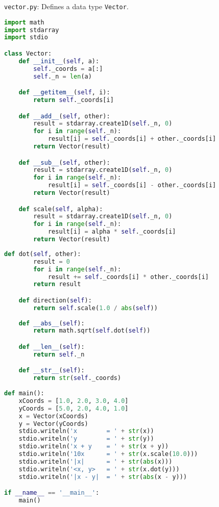 \documentclass[8pt,a4paper,compress,handout]{beamer}
\begin{document}
\begin{frame}[fragile]
\begin{framed}
\tiny \lstinline{vector.py}: Defines a data type \lstinline{Vector}.
\end{framed}

\begin{lstlisting}[language=Python]
import math
import stdarray
import stdio

class Vector:
    def __init__(self, a):
        self._coords = a[:]
        self._n = len(a)

    def __getitem__(self, i):
        return self._coords[i]

    def __add__(self, other):
        result = stdarray.create1D(self._n, 0)
        for i in range(self._n):
            result[i] = self._coords[i] + other._coords[i]
        return Vector(result)

    def __sub__(self, other):
        result = stdarray.create1D(self._n, 0)
        for i in range(self._n):
            result[i] = self._coords[i] - other._coords[i]
        return Vector(result)

    def scale(self, alpha):
        result = stdarray.create1D(self._n, 0)
        for i in range(self._n):
            result[i] = alpha * self._coords[i]
        return Vector(result)
\end{lstlisting}
\end{frame}

\begin{frame}[fragile]
\begin{lstlisting}[language=Python]
    def dot(self, other):
        result = 0
        for i in range(self._n):
            result += self._coords[i] * other._coords[i]
        return result

    def direction(self):
        return self.scale(1.0 / abs(self))
     
    def __abs__(self):
        return math.sqrt(self.dot(self))

    def __len__(self):
        return self._n

    def __str__(self):
        return str(self._coords)
        
def main():
    xCoords = [1.0, 2.0, 3.0, 4.0]
    yCoords = [5.0, 2.0, 4.0, 1.0]
    x = Vector(xCoords)
    y = Vector(yCoords)
    stdio.writeln('x        = ' + str(x))
    stdio.writeln('y        = ' + str(y))
    stdio.writeln('x + y    = ' + str(x + y))
    stdio.writeln('10x      = ' + str(x.scale(10.0)))
    stdio.writeln('|x|      = ' + str(abs(x)))
    stdio.writeln('<x, y>   = ' + str(x.dot(y)))
    stdio.writeln('|x - y|  = ' + str(abs(x - y)))

if __name__ == '__main__':
    main()
\end{lstlisting}
\end{frame}
\end{document}
